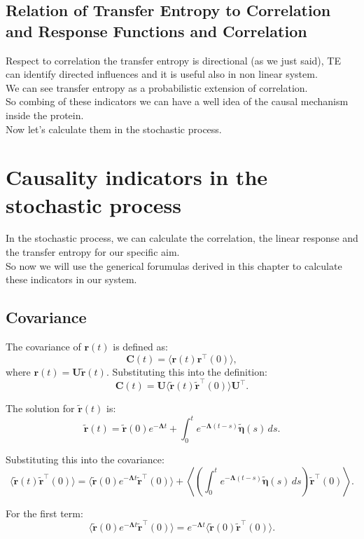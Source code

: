 \documentclass[English, Lau, oneside]{sapthesis}
\begin{document}
\subsection{Relation of Transfer Entropy to Correlation and Response Functions and Correlation}
\noindent Respect to correlation the transfer entropy is directional (as we just said), TE can identify directed influences and it is useful also in non linear system.\\
We can see transfer entropy as a probabilistic extension of correlation.\\
So combing of these indicators we can have a well idea of the causal mechanism inside the protein.\\
Now let's calculate them in the stochastic process.

\section{Causality indicators in the stochastic process}
\noindent In the stochastic process, we can calculate the correlation, the linear response and the transfer entropy for our specific aim.\\
So now we will use the generical forumulas derived in this chapter to calculate these indicators in our system.\\
\subsection {Covariance}
The covariance of \(\mathbf{r}(t)\) is defined as:
\[
\mathbf{C}(t) = \langle \mathbf{r}(t) \mathbf{r}^\top(0) \rangle,
\]
where \(\mathbf{r}(t) = \mathbf{U} \tilde{\mathbf{r}}(t)\). Substituting this into the definition:
\[
\mathbf{C}(t) = \mathbf{U} \langle \tilde{\mathbf{r}}(t) \tilde{\mathbf{r}}^\top(0) \rangle \mathbf{U}^\top.
\]

The solution for \(\tilde{\mathbf{r}}(t)\) is:
\[
\tilde{\mathbf{r}}(t) = \tilde{\mathbf{r}}(0) e^{-\boldsymbol{\Lambda} t} + \int_0^t e^{-\boldsymbol{\Lambda} (t-s)} \tilde{\boldsymbol{\eta}}(s) \, ds.
\]

Substituting this into the covariance:
\[
\langle \tilde{\mathbf{r}}(t) \tilde{\mathbf{r}}^\top(0) \rangle = \langle \tilde{\mathbf{r}}(0) e^{-\boldsymbol{\Lambda} t} \tilde{\mathbf{r}}^\top(0) \rangle + \left\langle \left( \int_0^t e^{-\boldsymbol{\Lambda} (t-s)} \tilde{\boldsymbol{\eta}}(s) \, ds \right) \tilde{\mathbf{r}}^\top(0) \right\rangle.
\]

For the first term:
\[
\langle \tilde{\mathbf{r}}(0) e^{-\boldsymbol{\Lambda} t} \tilde{\mathbf{r}}^\top(0) \rangle = e^{-\boldsymbol{\Lambda} t} \langle \tilde{\mathbf{r}}(0) \tilde{\mathbf{r}}^\top(0) \rangle.
\]
\end{document}
